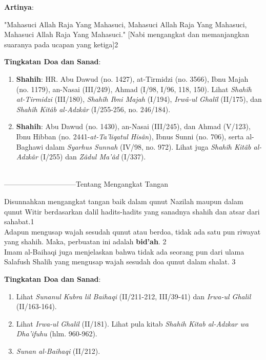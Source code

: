 \documentclass[a4paper,12pt]{article}
\begin{document}
\noindent
\textbf{Artinya}:
\par
\indent
"Mahasuci Allah Raja Yang Mahasuci, Mahasuci Allah Raja Yang Mahasuci, 
Mahasuci Allah Raja Yang Mahasuci." [Nabi mengangkat dan memanjangkan 
suaranya pada ucapan yang ketiga]{\scriptsize 2}\\
\par
\noindent
\textbf{Tingkatan Doa dan Sanad}: 
\begin{enumerate}
\item \textbf{Shahih}: HR. Abu Dawud (no. 1427), at-Tirmidzi (no. 3566), 
Ibnu Majah (no. 1179), an-Nasai (III/249), Ahmad (I/98, I/96, 118, 150). 
Lihat \textit{Shah\^{i}h at-Tirmidzi} (III/180), \textit{Shah\^{i}h Ibni 
Majah} (I/194), \textit{Irw\^{a}-ul Ghal\^{i}l} (II/175), dan 
\textit{Shah\^{i}h Kit\^{a}b al-Adzk\^{a}r} (I/255-256, no. 246/184).
\item \textbf{Shahih}: Abu Dawud (no. 1430), an-Nasai (III/245), dan Ahmad 
(V/123), Ibnu Hibban (no. 2441-\textit{at-Ta'liqatul His\^{a}n}), Ibnus 
Sunni (no. 706), serta al-Baghawi dalam \textit{Syarhus Sunnah} (IV/98, 
no. 972). Lihat juga \textit{Shah\^{i}h Kit\^{a}b al-Adzk\^{a}r} (I/255) 
dan \textit{Z\^{a}dul Ma'\^{a}d} (I/337).\\\\
\end{enumerate}
\par
{}------------------------------Tentang Mengangkat Tangan
\par
\indent
Disunnahkan mengangkat tangan baik dalam qunut Nazilah maupun dalam qunut 
Witir berdasarkan dalil hadits-hadits yang sanadnya shahih dan atsar dari 
sahabat.{\scriptsize 1}\\
\indent Adapun mengusap wajah sesudah qunut atau berdoa, tidak ada satu pun
riwayat yang shahih. Maka, perbuatan ini adalah \textbf{bid'ah}.
{\scriptsize 2}\\
\indent Imam al-Baihaqi juga menjelaskan bahwa tidak ada seorang pun dari 
ulama Salafush Shalih yang mengusap wajah sesudah doa qunut dalam shalat.
{\scriptsize 3}\\
\par
\noindent
\textbf{Tingkatan Doa dan Sanad}: 
\begin{enumerate}
\item Lihat \textit{Sunanul Kubra lil Baihaqi} (II/211-212, III/39-41) dan 
\textit{Irwa-ul Ghalil} (II/163-164).
\item Lihat \textit{Irwa-ul Ghalil} (II/181). Lihat pula kitab 
\textit{Shahih Kitab al-Adzkar wa Dha'ifuhu} (hlm. 960-962).
\item \textit{Sunan al-Baihaqi} (II/212).\\\\
\end{enumerate}
\end{document}
